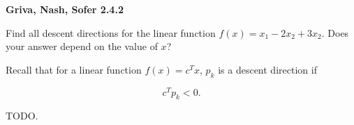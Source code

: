 \textbf{Griva, Nash, Sofer 2.4.2}

Find all descent directions for the linear function $f(x) = x_1 - 2x_2 + 3x_2$. Does your
answer depend on the value of $x$?

\begin{solution}
  Recall that for a linear function $f(x) = c^Tx$, $p_k$ is a descent direction if

  $$
    c^T p_k < 0.
  $$

  TODO.
  \ \\
\end{solution}